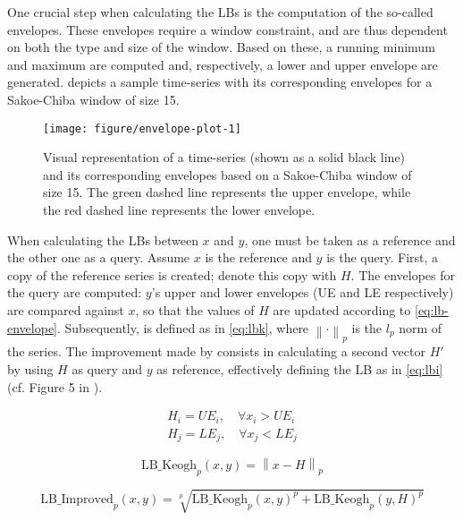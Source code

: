 One crucial step when calculating the LBs is the computation of the so-called envelopes.
These envelopes require a window constraint,
and are thus dependent on both the type and size of the window.
Based on these, a running minimum and maximum are computed and, respectively, a lower and upper envelope are generated.
 depicts a sample time-series with its corresponding envelopes for a Sakoe-Chiba window of size 15.

\begin{figure}[htbp]

{\centering \texttt{[image: figure/envelope-plot-1]}

}

\caption{Visual representation of a time-series (shown as a solid black line) and its corresponding envelopes based on a Sakoe-Chiba window of size 15. The green dashed line represents the upper envelope, while the red dashed line represents the lower envelope.}\label{fig:envelope-plot}
\end{figure}

When calculating the LBs between $x$ and $y$,
one must be taken as a reference and the other one as a query.
Assume $x$ is the reference and $y$ is the query.
First, a copy of the reference series is created;
denote this copy with $H$.
The envelopes for the query are computed:
$y$'s upper and lower envelopes (UE and LE respectively) are compared against $x$,
so that the values of $H$ are updated according to \cref{eq:lb-envelope}.
Subsequently,  is defined as in \cref{eq:lbk},
where $\left\lVert \cdot \right\rVert_p$ is the $l_p$ norm of the series.
The improvement made by  consists in calculating a second vector $H'$ by using $H$ as query and $y$ as reference,
effectively defining the LB as in \cref{eq:lbi} (cf. Figure 5 in \citet{lemire2009}).

\begin{subequations}
\label{eq:lb-envelope}
\begin{gather}
H_i = UE_i, \quad \forall x_i > UE_i \\
H_j = LE_j, \quad \forall x_j < LE_j
\end{gather}
\end{subequations}

\begin{equation}
\label{eq:lbk}
\text{LB\_Keogh}_p(x,y) = \left\lVert x - H \right\rVert_p
\end{equation}

\begin{equation}
\label{eq:lbi}
\text{LB\_Improved}_p(x,y) = \sqrt[p]{\text{LB\_Keogh}_p(x,y)^p + \text{LB\_Keogh}_p(y,H)^p}
\end{equation}

